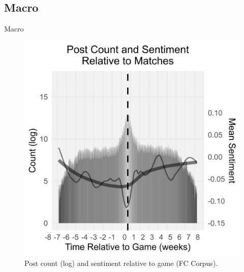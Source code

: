 \documentclass[10pt]{beamer}
\begin{document}
\subsection{Macro}
\begin{frame}{Macro}
\begin{figure}
    \includegraphics[width=\textwidth,height=0.8\textheight,keepaspectratio]{sent_v_weeks_to_match_small_600dpi.jpg}
    \caption{Post count (log) and sentiment relative to game (FC Corpus).}
    \label{fig:sentimentchange}
\end{figure}
\end{frame}
\end{document}
